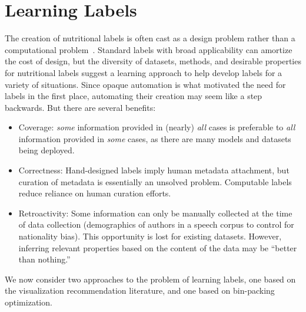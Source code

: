 \label{sec:learning}
\section{Learning Labels}

The creation of nutritional labels is often cast as a design problem rather than a computational problem~\cite{DBLP:journals/corr/abs-1803-09010,DBLP:journals/corr/abs-1805-03677}. Standard labels with broad applicability can amortize the cost of design, but the diversity of datasets, methods, and desirable properties for nutritional labels suggest a learning approach to help develop labels for a variety of situations. Since opaque automation is what motivated the need for labels in the first place, automating their creation may seem like a step backwards.  But there are several benefits:
\begin{itemize}
    \item Coverage: \emph{some} information provided in (nearly) \emph{all} cases is preferable to \emph{all} information provided in \emph{some} cases, as there are many models and datasets being deployed.
    \item Correctness: Hand-designed labels imply human metadata attachment, but curation of metadata is essentially an unsolved problem.  Computable labels reduce reliance on human curation efforts.
    \item Retroactivity: Some information can only be manually collected at the time of data collection (\eg demographics of authors in a speech corpus to control for nationality bias). This opportunity is lost for existing datasets.  However, inferring relevant properties based on the content of the data may be ``better than nothing.'' 
\end{itemize} 

We now consider two approaches to the problem of learning labels, one based on the visualization recommendation literature, and one based on bin-packing optimization.

